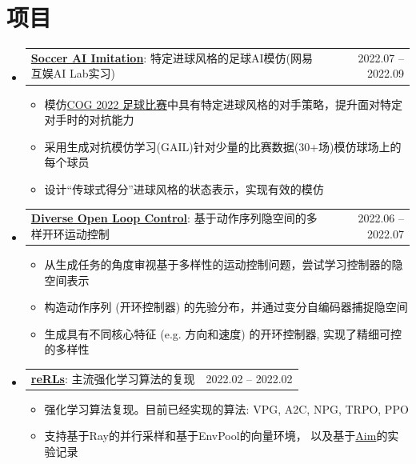 \documentclass{resume}
\makeatletter
\newcommand{\resumeSubheadingSimple}[2]{
  \vspace{-1pt}\item
    \begin{tabular*}{1.00\textwidth}[t]{l@{\extracolsep{\fill}}r}
      \large{#1} & \large{#2} \\
    \end{tabular*}%

%
}
\newcommand{\resumeSubHeadingListStart}{\begin{itemize}[leftmargin=*]}
\newcommand{\resumeSubHeadingListEnd}{\end{itemize}}
\makeatother
\begin{document}
\section{项目}
\resumeSubHeadingListStart
\resumeSubheadingSimple{
      \href{https://github.com/mantle2048/diverse_openloop}{\textbf{Soccer AI Imitation}}: 特定进球风格的足球AI模仿(网易互娱AI Lab实习)}{2022.07 -- 2022.09}
    \begin{itemize}
        \item 模仿\href{http://www.jidiai.cn/cog_2022/}{COG 2022 足球比赛}中具有特定进球风格的对手策略，提升面对特定对手时的对抗能力
        \item 采用生成对抗模仿学习(GAIL)针对少量的比赛数据(30+场)模仿球场上的每个球员
        \item
        设计“传球式得分”进球风格的状态表示，实现有效的模仿
    \end{itemize}
\resumeSubheadingSimple{
      \href{https://github.com/mantle2048/diverse_openloop}{\textbf{Diverse Open Loop Control}}: 基于动作序列隐空间的多样开环运动控制}{2022.06 -- 2022.07}
      \begin{itemize}
      \item 从生成任务的角度审视基于多样性的运动控制问题，尝试学习控制器的隐空间表示
      \item 构造动作序列 (开环控制器) 的先验分布，并通过变分自编码器捕捉隐空间
      \item 生成具有不同核心特征 (e.g. 方向和速度) 的开环控制器, 实现了精细可控的多样性
    \end{itemize}
%
\resumeSubheadingSimple{
    \href{https://github.com/mantle2048/reRLs}{\textbf{reRLs}}: 主流强化学习算法的复现}{2022.02 -- 2022.02}
      \begin{itemize}
      \item 强化学习算法复现。目前已经实现的算法:
          VPG,
          A2C,
          NPG,
          TRPO, 
          PPO
      \item 支持基于Ray的并行采样和基于EnvPool的向量环境， 以及基于\href{https://github.com/aimhubio/aim}{Aim}的实验记录
    \end{itemize}
\resumeSubHeadingListEnd

%
\end{document}
